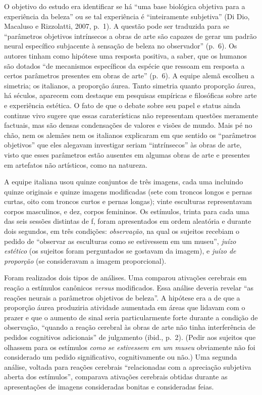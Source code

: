 O objetivo do estudo era identificar se há ``uma base biológica objetiva
para a experiência da beleza'' ou se tal experiência é ``inteiramente
subjetiva'' (Di Dio, Macaluso e Rizzolatti, 2007, p.~1). A questão pode
ser traduzida para se ``parâmetros objetivos intrínsecos a obras de arte
são capazes de gerar um padrão neural específico subjacente à sensação
de beleza no observador'' (p.~6). Os autores tinham como hipótese uma
resposta positiva, a saber, que os humanos são dotados ``de mecanismos
específicos da espécie que ressoam em resposta a certos parâmetros
presentes em obras de arte'' (p.~6). A equipe alemã escolheu a simetria;
os italianos, a proporção áurea. Tanto simetria quanto proporção áurea,
há séculos, aparecem com destaque em pesquisas empíricas e filosóficas
sobre arte e experiência estética. O fato de que o debate sobre seu
papel e status ainda continue vivo sugere que essas caraterísticas não
representam questões meramente factuais, mas são densas condensações de
valores e visões de mundo. Mais pé no chão, nem os alemães nem os
italianos explicaram em que sentido os ``parâmetros objetivos'' que eles
alegavam investigar seriam ``intrínsecos'' às obras de arte, visto que
esses parâmetros estão ausentes em algumas obras de arte e presentes em
artefatos não artísticos, como na natureza.

A equipe italiana usou quinze conjuntos de três imagens, cada uma
incluindo quinze originais e quinze imagens modificadas (sete com
troncos longos e pernas curtas, oito com troncos curtos e pernas
longas); vinte esculturas representavam corpos masculinos, e dez, corpos
femininos. Os estímulos, trinta para cada uma das seis sessões distintas
de f, foram apresentados em ordem aleatória e durante dois segundos,
em três condições: \emph{observação}, na qual os sujeitos recebiam o
pedido de ``observar as esculturas como se estivessem em um museu'',
\emph{juízo estético} (os sujeitos foram perguntados se gostavam da
imagem), e \emph{juízo de proporção} (se consideravam a imagem
proporcional).

Foram realizados dois tipos de análises. Uma comparou ativações
cerebrais em reação a estímulos canônicos \emph{versus} modificados.
Essa análise deveria revelar ``as reações neurais a parâmetros objetivos
de beleza''. A hipótese era a de que a proporção áurea produziria
atividade aumentada em áreas que lidavam com o prazer e que o aumento de
sinal seria particularmente forte durante a condição de observação,
``quando a reação cerebral às obras de arte não tinha interferência de
pedidos cognitivos adicionais'' de julgamento (ibid., p.~2). (Pedir aos
sujeitos que olhassem para os estímulos \emph{como se estivessem em um
museu} obviamente não foi considerado um pedido significativo,
cognitivamente ou não.) Uma segunda análise, voltada para reações
cerebrais ``relacionadas com a apreciação subjetiva aberta dos
estímulos'', comparava ativações cerebrais obtidas durante as
apresentações de imagens consideradas bonitas e consideradas feias.

